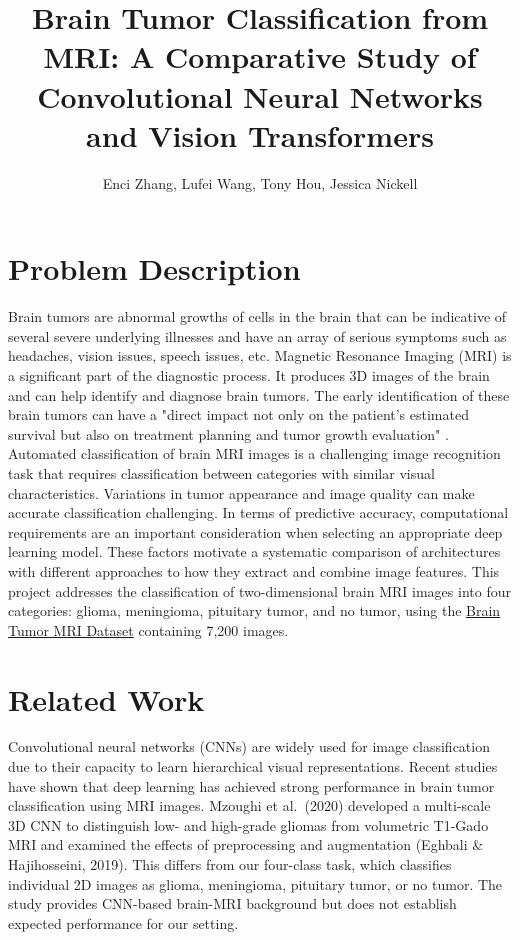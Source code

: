 \documentclass{article}
\title{Brain Tumor Classification from MRI: A Comparative Study of Convolutional Neural Networks and Vision Transformers}
\author{Enci Zhang, Lufei Wang, Tony Hou, Jessica Nickell}
\date{} %
\begin{document}
\maketitle
\section*{Problem Description}
Brain tumors are abnormal growths of cells in the brain that can be indicative of several severe underlying illnesses and have an array of serious 
symptoms such as headaches, vision issues, speech issues, etc. Magnetic Resonance Imaging (MRI) is a significant part of the diagnostic process. 
It produces 3D images of the brain and can help identify and diagnose brain tumors. The early identification of these brain tumors can have a "direct 
impact not only on the patient's estimated survival but also on treatment planning and tumor growth evaluation" \citet{mzoughi2020}. Automated classification of brain 
MRI images is a challenging image recognition task that requires classification between categories with similar visual 
characteristics. Variations in tumor appearance and image quality can make accurate classification challenging. In terms of predictive accuracy, 
computational requirements are an important consideration when selecting an appropriate deep learning model. These factors motivate a systematic 
comparison of architectures with different approaches to how they extract and combine image features. This project addresses the classification of 
two-dimensional brain MRI images into four categories: glioma, meningioma, pituitary tumor, and no tumor, using the 
\href{https://www.kaggle.com/datasets/masoudnickparvar/brain-tumor-mri-dataset}{Brain Tumor MRI Dataset} containing 7,200 images.

\section*{Related Work}
Convolutional neural networks (CNNs) are widely used for image classification due to their capacity to learn hierarchical visual representations.
Recent studies have shown that deep learning has achieved strong performance in brain tumor classification using MRI images. 
Mzoughi et al.\ (2020) developed a multi-scale 3D CNN to distinguish low- and
high-grade gliomas from volumetric T1-Gado MRI and examined the effects of
preprocessing and augmentation (Eghbali \& Hajihosseini, 2019). This differs
from our four-class task, which classifies individual 2D images as glioma,
meningioma, pituitary tumor, or no tumor. The study provides
CNN-based brain-MRI background but does not establish expected performance
for our setting.
\end{document}
